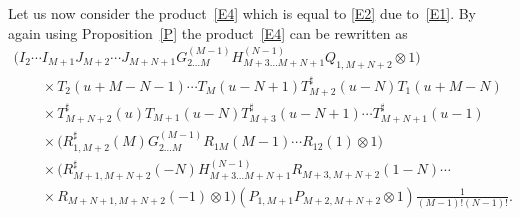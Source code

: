 \documentclass[pdftex]{sigma}
\numberwithin{equation}{section}
\def\ot{\otimes}
\def\RS{R^{\sharp}}
\def\TS{T^{\sharp}}
\begin{document}
Let us now consider the product~\eqref{E4} which
is equal to \eqref{E2} due to~\eqref{E1}.
By again using Proposition~\ref{P}
the product~\eqref{E4} can be rewritten as
\begin{gather*}
 \big( I_{2} \cdots I_{M+1}
J_{M+2} \cdots J_{M+N+1}
G_{2 \dots M}^{(M-1)} H_{M+3 \dots M+N+1}^{(N-1)}
Q_{1,M+N+2}\ot1 \big)\\
\qquad{} \times
 T_2 (u+M-N-1) \cdots T_{M} (u-N+1)
\TS_{M+2} (u-N) T_1 (u+M-N)\\
\qquad{} \times \TS_{M+N+2} (u) T_{M+1} (u-N)
\TS_{M+3} (u-N+1) \cdots \TS_{M+N+1} (u-1)\\
\qquad{} \times \big( \RS_{1,M+2} (M ) G_{2 \dots M}^{(M-1)}
R_{1M} (M-1) \cdots R_{12} (1)\ot1 \big)\\
\qquad{} \times \big( \RS_{M+1,M+N+2} (-N ) H_{M+3 \dots M+N+1}^{(N-1)}
R_{M+3,M+N+2} (1-N) \cdots\\
\qquad{} \times R_{M+N+1,M+N+2} (-1)\ot1 \big) ( P_{1,M+1} P_{M+2,M+N+2}\ot1 )
\frac1{(M-1) ! (N-1) !} .
\end{gather*}
\end{document}

